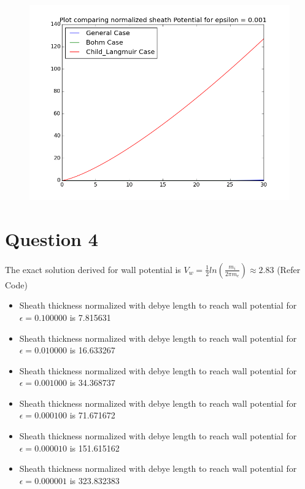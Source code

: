 \documentclass[11pt, a4paper]{article}
\begin{document}
\begin{figure}[H]
 \centering
 \includegraphics[width = \textwidth]{q3Veps3.png}
\end{figure}

\section{Question 4}
The exact solution derived for wall potential is $V_w = \frac{1}{2}ln(\frac{m_i}{2\pi m_e}) \approx 2.83$ 
(Refer Code)
\begin{itemize}
 \item Sheath thickness normalized with debye length to reach wall potential for $\epsilon = 0.100000$ is 7.815631
 \item Sheath thickness normalized with debye length to reach wall potential for $\epsilon = 0.010000$ is 16.633267
 \item Sheath thickness normalized with debye length to reach wall potential for $\epsilon = 0.001000$ is 34.368737
 \item Sheath thickness normalized with debye length to reach wall potential for $\epsilon = 0.000100$ is 71.671672
  \item Sheath thickness normalized with debye length to reach wall potential for $\epsilon = 0.000010$ is 151.615162
  \item Sheath thickness normalized with debye length to reach wall potential for $\epsilon = 0.000001$ is 323.832383
\end{itemize}
\end{document}
